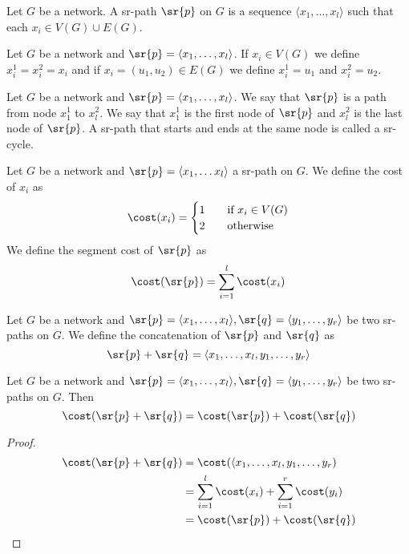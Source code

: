 \begin{definition}
Let $G$ be a network. A sr-path $\sr{p}$ on $G$ is a sequence $\langle x_1, \ldots, x_l \rangle$ such that each $x_i \in V(G) \cup E(G)$.
\end{definition}

\begin{definition}
Let $G$ be a network and $\sr{p} = \langle x_1, \ldots, x_l \rangle$. If $x_i \in V(G)$ we define $x^1_i = x^2_i = x_i$ and
if $x_i = (u_1, u_2) \in E(G)$ we define $x^1_i = u_1$ and $x^2_i = u_2$. 
\end{definition}

\begin{definition}
Let $G$ be a network and $\sr{p} = \langle x_1, \ldots, x_l \rangle$. We say that $\sr{p}$ is a path from node $x^1_1$ to
$x^2_l$. We say that $x^1_1$ is the first node of $\sr{p}$ and $x^2_l$ is the last node of $\sr{p}$. A sr-path that
starts and ends at the same node is called a sr-cycle.
\end{definition}

\begin{definition}
Let $G$ be a network and $\sr{p} = \langle x_1, \ldots x_l \rangle$ a sr-path on $G$. We define the cost of $x_i$ as
\[ \cost(x_i) =
  \begin{cases}
    1 & \quad \text{if } x_{i} \in V(G) \\
    2 & \quad \text{otherwise}
  \end{cases}
\]
We define the segment cost of $\sr{p}$ as
$$
\cost(\sr{p}) = \sum_{i = 1}^l \cost(x_i)
$$
\end{definition}

\begin{definition}
Let $G$ be a network and $\sr{p} = \langle x_1, \ldots, x_l \rangle, \sr{q} = \langle y_1, \ldots, y_r \rangle$ be two sr-paths on $G$. We 
define the concatenation of $\sr{p}$ and $\sr{q}$ as
$$
\sr{p} + \sr{q} = \langle x_1, \ldots, x_l, y_1, \ldots, y_r \rangle
$$
\end{definition}

\begin{lemma}
\label{lemma:srsumcost}
Let $G$ be a network and $\sr{p} = \langle x_1, \ldots, x_l \rangle, \sr{q} = \langle y_1, \ldots, y_r \rangle$ be two sr-paths on $G$. Then
$$
\cost(\sr{p} + \sr{q}) = \cost(\sr{p}) + \cost(\sr{q}) 
$$
\end{lemma}

\begin{proof}
\begin{align*}
\cost(\sr{p} + \sr{q}) & = \cost(\langle x_1, \ldots, x_l, y_1, \ldots, y_r) \\
& = \sum_{i = 1}^l \cost(x_i) + \sum_{i = 1}^r \cost(y_i) \\
& = \cost(\sr{p}) + \cost(\sr{q})
\end{align*}
\end{proof}

